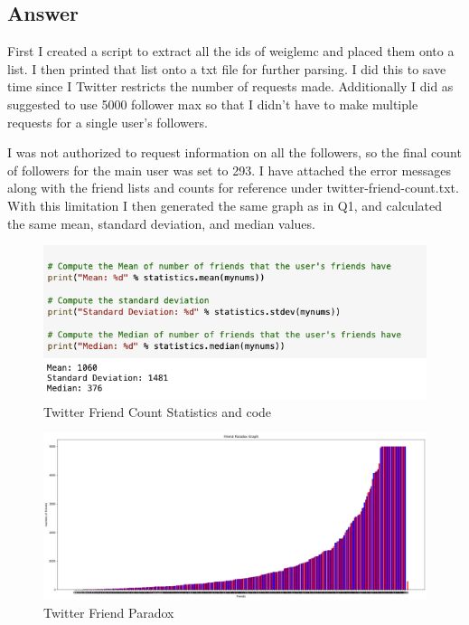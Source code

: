 \documentclass[12pt]{article}
\begin{document}
\subsection*{Answer}
First I created a script to extract all the ids of weiglemc and placed them onto a list. I then printed that list onto a txt file for further parsing. I did this to save time since I Twitter restricts the number of requests made.  Additionally I did as suggested to use 5000 follower max so that I didn't have to make multiple requests for a single user's followers.



I was not authorized to request information on all the followers, so the final count of followers for the main user was set to 293. I have attached the error messages along with the friend lists and counts for reference under twitter-friend-count.txt. With this limitation I then generated the same graph as in Q1, and calculated the same mean, standard deviation, and median values.

\begin{figure}
    \includegraphics[trim=0 0 10 50, clip, width=\textwidth] {twitter-statistics.png}
    \caption{Twitter Friend Count Statistics and code}
    \label{fig:friend}
\end{figure}

\begin{figure}
    \includegraphics[trim=0 20 10 50, clip, width=\textwidth] {q2-twitter-friend-paradox.png}
    \caption{Twitter Friend Paradox}
    \label{fig:friend}
\end{figure}
\end{document}
